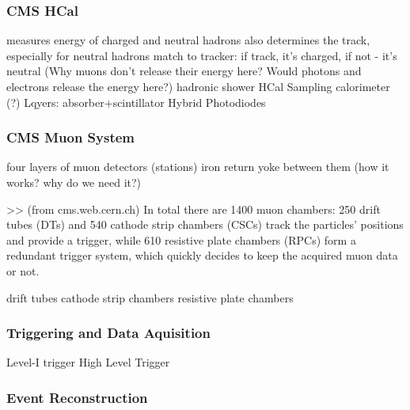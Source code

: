 \subsubsection{CMS HCal}
measures energy of charged and neutral hadrons
also determines the track, especially for neutral hadrons
match to tracker: if track, it's charged, if not - it's neutral
(Why muons don't release their energy here? Would photons and electrons release the energy here?)
hadronic shower
HCal Sampling calorimeter (?)
Lqyers: absorber+scintillator
Hybrid Photodiodes

\subsubsection{CMS Muon System}
four layers of muon detectors (stations)
iron return yoke between them (how it works? why do we need it?)

>> (from cms.web.cern.ch) In total there are 1400 muon chambers: 250 drift tubes (DTs) and 540 cathode strip chambers (CSCs) track the particles’ positions and provide a trigger, while 610 resistive plate chambers (RPCs) form a redundant trigger system, which quickly decides to keep the acquired muon data or not. 

drift tubes
cathode strip chambers
resistive plate chambers

\subsubsection{Triggering and Data Aquisition}
Level-I trigger
High Level Trigger

\subsubsection{Event Reconstruction}


